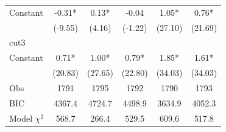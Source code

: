 {\begin{tabular*}{\hsize}{@{\hskip\tabcolsep\extracolsep\fill}l*{5}{c}}
Constant            &       -0.31*&        0.13*&       -0.04 &        1.05*&        0.76*\\
                    &     (-9.55) &      (4.16) &     (-1.22) &     (27.10) &     (21.69) \\
\midrule
cut3                &             &             &             &             &             \\
Constant            &        0.71*&        1.00*&        0.79*&        1.85*&        1.61*\\
                    &     (20.83) &     (27.65) &     (22.80) &     (34.03) &     (34.03) \\
\midrule
Obs                 &        1791 &        1795 &        1792 &        1790 &        1793 \\
BIC                 &      4367.4 &      4724.7 &      4498.9 &      3634.9 &      4052.3 \\
Model $\chi^{2}$    &       568.7 &       266.4 &       529.5 &       609.6 &       517.8 \\
\bottomrule
\end{tabular*}
}
